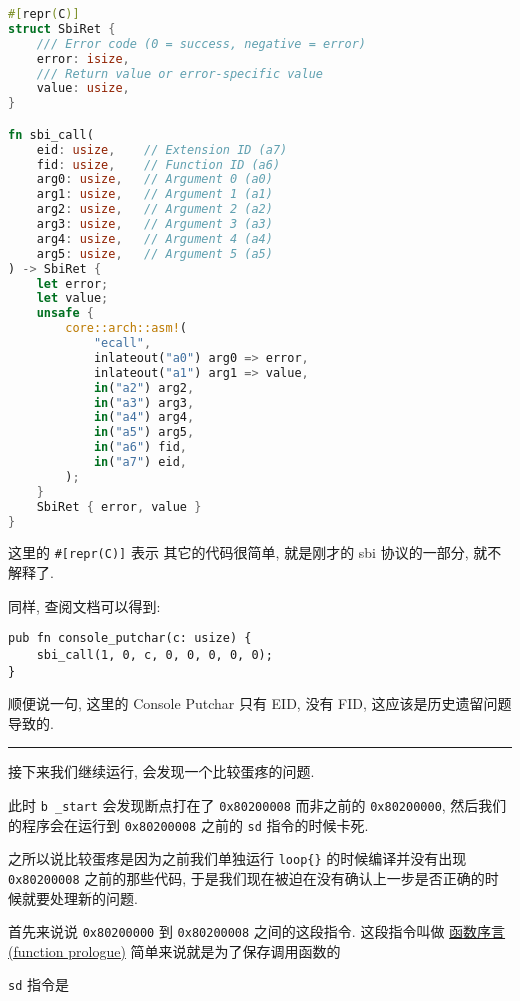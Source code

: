 \documentclass[a4paper]{ctexart}
\newcommand{\customhrule}{
    \vspace{0.1cm}
    \noindent\rule{\linewidth}{0.5pt}
}
\begin{document}
\begin{lstlisting}[language=rust]
#[repr(C)]
struct SbiRet {
    /// Error code (0 = success, negative = error)
    error: isize,
    /// Return value or error-specific value
    value: usize,
}

fn sbi_call(
    eid: usize,    // Extension ID (a7)
    fid: usize,    // Function ID (a6)
    arg0: usize,   // Argument 0 (a0)
    arg1: usize,   // Argument 1 (a1)
    arg2: usize,   // Argument 2 (a2)
    arg3: usize,   // Argument 3 (a3)
    arg4: usize,   // Argument 4 (a4)
    arg5: usize,   // Argument 5 (a5)
) -> SbiRet {
    let error;
    let value;
    unsafe {
        core::arch::asm!(
            "ecall",
            inlateout("a0") arg0 => error,
            inlateout("a1") arg1 => value,
            in("a2") arg2,
            in("a3") arg3,
            in("a4") arg4,
            in("a5") arg5,
            in("a6") fid,
            in("a7") eid,
        );
    }
    SbiRet { error, value }
}
\end{lstlisting}
这里的 \verb|#[repr(C)]| 表示
其它的代码很简单, 就是刚才的 sbi 协议的一部分,
就不解释了.

同样, 查阅文档可以得到:
\begin{lstlisting}
pub fn console_putchar(c: usize) {
    sbi_call(1, 0, c, 0, 0, 0, 0, 0);
}
\end{lstlisting}
顺便说一句, 这里的 Console Putchar 只有 EID,
没有 FID, 这应该是历史遗留问题导致的.

\customhrule{}

接下来我们继续运行,
会发现一个比较蛋疼的问题.

此时 \verb|b _start| 会发现断点打在了 \verb|0x80200008|
而非之前的 \verb|0x80200000|, 然后我们的程序会在运行到
\verb|0x80200008| 之前的 \verb|sd| 指令的时候卡死.

之所以说比较蛋疼是因为之前我们单独运行 \verb|loop{}|
的时候编译并没有出现 \verb|0x80200008| 之前的那些代码,
于是我们现在被迫在没有确认上一步是否正确的时候就要处理新的问题.

首先来说说 \verb|0x80200000| 到 \verb|0x80200008|
之间的这段指令.
这段指令叫做
\href{https://en.wikipedia.org/wiki/Function_prologue_and_epilogue}{函数序言(function prologue)}
简单来说就是为了保存调用函数的

\verb|sd| 指令是



\end{document}
